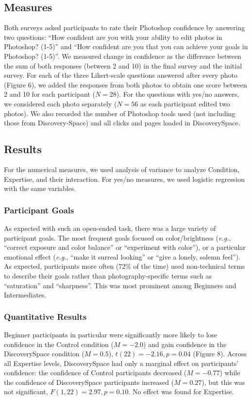 \subsection{Measures}
Both surveys asked participants to rate their Photoshop confidence by answering two questions: ``How confident are you with your ability to edit photos in Photoshop? (1-5)'' and ``How confident are you that you can achieve your goals in Photoshop? (1-5)''. We measured change in confidence as the difference between the sum of both responses (between 2 and 10) in the final survey and the initial survey. For each of the three Likert-scale questions answered after every photo (Figure 6), we added the responses from both photos to obtain one score between 2 and 10 for each participant ($N = 28$). For the questions with yes/no answers, we considered each photo separately ($N = 56$ as each participant edited two photos). We also recorded the number of Photoshop tools used (not including those from Discovery-Space) and all clicks and pages loaded in Discovery\-Space.

\subsection{Results}
For the numerical measures, we used analysis of variance to analyze Condition, Expertise, and their interaction. For yes/no measures, we used logistic regression with the same variables. 

\subsubsection{Participant Goals}
As expected with such an open-ended task, there was a large variety of participant goals. The most frequent goals focused on color/brightness (\textit{e.g.}, ``correct exposure and color balance'' or ``experiment with color''), or a particular emotional effect (\textit{e.g.}, ``make it surreal looking'' or ``give a lonely, solemn feel''). As expected, participants more often (72\% of the time) used non-technical terms to describe their goals rather than photography-specific terms such as ``saturation'' and ``sharpness''. This was most prominent among Beginners and Intermediates.

\subsubsection{Quantitative Results}
Beginner participants in particular were significantly more likely to lose confidence in the Control condition ($M = -2.0$) and gain confidence in the Discovery\-Space condition ($M = 0.5$), $t(22) = -2.16, p = 0.04$ (Figure 8). Across all Expertise levels, Discovery\-Space had only a marginal effect on participants' confidence: the confidence of Control participants decreased ($M = -0.77$) while the confidence of Discovery\-Space participants increased ($M = 0.27$), but this was not significant, $F(1, 22) = 2.97, p = 0.10$. No effect was found for Expertise. 

